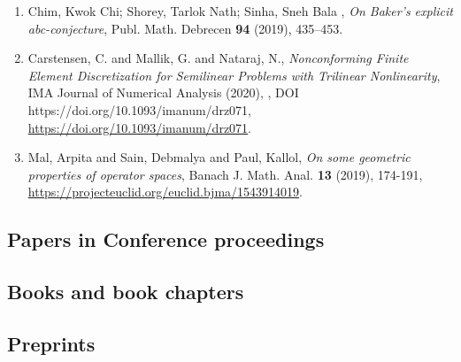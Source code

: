 \begin{enumerate}
\item Chim, Kwok Chi; Shorey, Tarlok Nath; Sinha, Sneh Bala , \emph{On Baker's explicit abc-conjecture},  Publ. Math. Debrecen {\bf 94} (2019), 435–453.
\item Carstensen, C. and Mallik, G. and Nataraj, N., \emph{Nonconforming Finite Element Discretization for Semilinear Problems with Trilinear Nonlinearity}, IMA Journal of Numerical Analysis {\bf } (2020), , DOI https://doi.org/10.1093/imanum/drz071, \url{https://doi.org/10.1093/imanum/drz071}.
\item Mal, Arpita and Sain, Debmalya and Paul, Kallol, \emph{On some geometric properties of operator spaces}, Banach J. Math. Anal. {\bf 13} (2019), 174-191, \url{https://projecteuclid.org/euclid.bjma/1543914019}.
\end{enumerate}

\subsection{Papers in Conference proceedings}

\begin{enumerate}

\end{enumerate}

\subsection{Books and book chapters}

\begin{enumerate}

\end{enumerate}

\subsection{Preprints}

